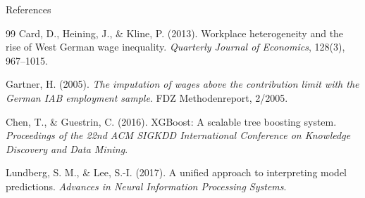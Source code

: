 \documentclass[10pt]{beamer}
\begin{document}
\begin{frame}{References}
\footnotesize
\begin{thebibliography}{99}
Card, D., Heining, J., \& Kline, P. (2013).
Workplace heterogeneity and the rise of West German wage inequality.
\emph{Quarterly Journal of Economics}, 128(3), 967--1015.

Gartner, H. (2005).
\emph{The imputation of wages above the contribution limit with the German IAB employment sample}.
FDZ Methodenreport, 2/2005.

Chen, T., \& Guestrin, C. (2016).
XGBoost: A scalable tree boosting system.
\emph{Proceedings of the 22nd ACM SIGKDD International Conference on Knowledge Discovery and Data Mining}.

Lundberg, S. M., \& Lee, S.-I. (2017).
A unified approach to interpreting model predictions.
\emph{Advances in Neural Information Processing Systems}.
\end{thebibliography}
\end{frame}
\end{document}
